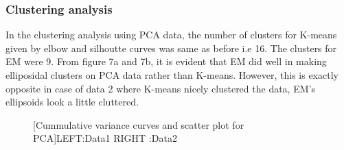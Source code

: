 \documentclass[12pt]{article}
\begin{document}
\subsubsection*{Clustering analysis}
In the clustering analysis using PCA data, the number of clusters for K-means given by elbow and silhoutte curves was same as before i.e 16. The clusters for EM were 9. From figure 7a and 7b, it is evident that EM did well in making elliposidal clusters on PCA data rather than K-means. However, this is exactly opposite in case of data 2 where K-means nicely clustered the data, EM's ellipsoids look a little cluttered.


\begin{figure}[htbp]
    \centering
    \caption{[Cummulative variance curves and scatter plot for PCA]LEFT:Data1 RIGHT
    :Data2}
    \label{fig:foobar}
\end{figure}
\end{document}
